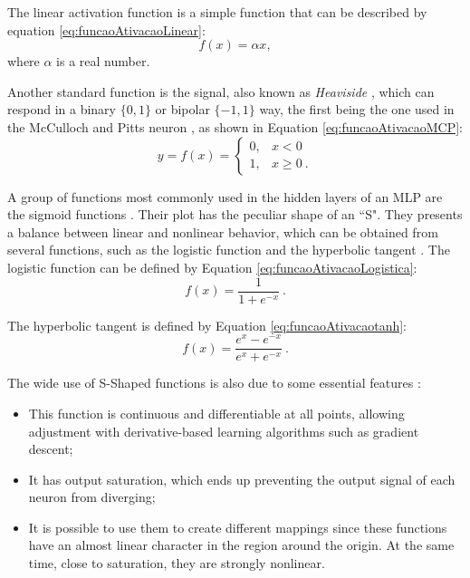 The linear activation function is a simple function that can be described by equation \ref{eq:funcaoAtivacaoLinear}: \begin{equation}
	\label{eq:funcaoAtivacaoLinear}
	f(x) = \alpha x,
\end{equation}
\noindent where $\alpha$ is a real number.

Another standard function is the signal, also known as \textit{Heaviside} \cite{haykin}, which can respond in a binary $\{0, 1\}$ or bipolar $\{-1, 1\}$ way, the first being the one used in the McCulloch and Pitts neuron \cite{McCulloch1990}, as shown in Equation \ref{eq:funcaoAtivacaoMCP}:
\begin{equation}
	\label{eq:funcaoAtivacaoMCP}
	y = f(x) = \left\{\begin{matrix}
		0, & x < 0    \\
		1, & x \geq 0 \: .
	\end{matrix}\right.
\end{equation}

A group of functions most commonly used in the hidden layers of an MLP are the sigmoid functions \cite{haykin, Castro2006FundamentalsON}. Their plot has the peculiar shape of an ``S". They presents a balance between linear and nonlinear behavior, which can be obtained from several functions, such as the logistic function and the hyperbolic tangent \cite{Jeffrey2008}. The logistic function can be defined by Equation \ref{eq:funcaoAtivacaoLogistica}:
\begin{equation}
	\label{eq:funcaoAtivacaoLogistica}
	f(x) = \frac{1}{1 + e^{-x}}\:.
\end{equation}

The hyperbolic tangent is defined by Equation \ref{eq:funcaoAtivacaotanh}:
\begin{equation}
\label{eq:funcaoAtivacaotanh}
	f(x) = \frac{e^x - e^{-x}}{e^x + e^{-x}}\:.
\end{equation}

The wide use of S-Shaped functions is also due to some essential features \cite{Menon1996}:

\begin{itemize}
    \item This function is continuous and differentiable at all points, allowing adjustment with derivative-based learning algorithms such as gradient descent;
    \item It has output saturation, which ends up preventing the output signal of each neuron from diverging;
    \item It is possible to use them to create different mappings since these functions have an almost linear character in the region around the origin. At the same time, close to saturation, they are strongly nonlinear.
\end{itemize}

